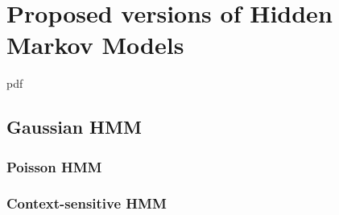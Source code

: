 \chapter{Proposed versions of Hidden Markov Models}

\if
pdf
    \graphicspath{{Chapter4/Figs/Raster/}{Chapter4/Figs/PDF/}{Chapter4/Figs/}}
\else
    \graphicspath{{Chapter4/Figs/Vector/}{Chapter4/Figs/}}
\fi


\section{Gaussian HMM}

\subsection{Poisson HMM}

\subsection{Context-sensitive HMM}
